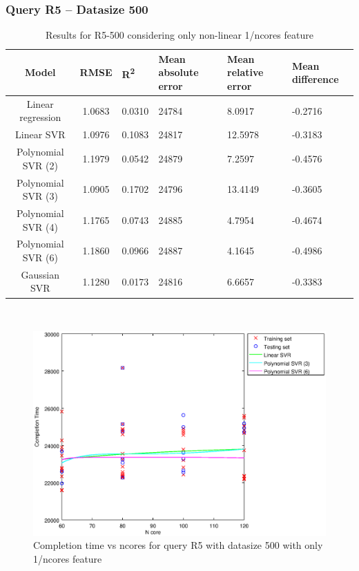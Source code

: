 \documentclass[a4paper,11pt]{article}
\begin{document}
\newpage
\subsubsection{Query R5 -- Datasize 500}
\begin{table}[H]
	\centering
	\begin{adjustbox}{center}
		\begin{tabular}{c | c M{1.2cm} M{2.5cm} M{2.5cm} M{1.8cm}}
			Model & RMSE & R\textsuperscript{2} & Mean absolute error & Mean relative error & Mean difference \tabularnewline
			\hline
			Linear regression & 1.0683 & 0.0310 &  24784 & 8.0917 & -0.2716 \\
			Linear SVR & 1.0976 & 0.1083 &  24817 & 12.5978 & -0.3183 \\
			Polynomial SVR (2) & 1.1979 & 0.0542 &  24879 & 7.2597 & -0.4576 \\
			Polynomial SVR (3) & 1.0905 & 0.1702 &  24796 & 13.4149 & -0.3605 \\
			Polynomial SVR (4) & 1.1765 & 0.0743 &  24885 & 4.7954 & -0.4674 \\
			Polynomial SVR (6) & 1.1860 & 0.0966 &  24887 & 4.1645 & -0.4986 \\
			Gaussian SVR & 1.1280 & 0.0173 &  24816 & 6.6657 & -0.3383 \\
		\end{tabular}
	\end{adjustbox}
	\\
	\caption{Results for R5-500 considering only non-linear 1/ncores feature}
	\label{table_R5_prediction_all}
\end{table}

\begin {figure}[hbtp]
\centering
\includegraphics[width=\textwidth]{output/R5_500_ONLY_1_OVER_NCORES/plot_R5_500_bestmodels.eps}
\caption {Completion time vs ncores for query R5 with datasize 500 with only 1/ncores feature}
\end {figure}
\end{document}
